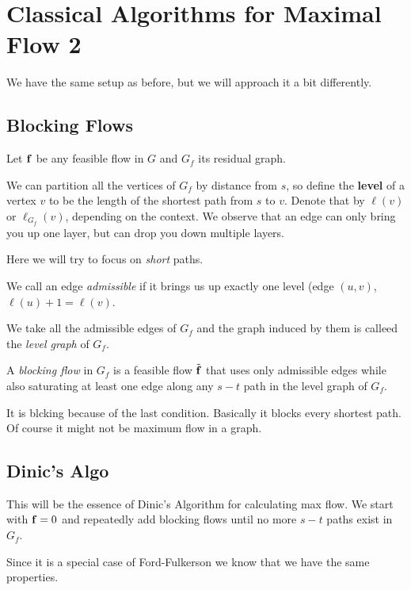 
\section{Classical Algorithms for Maximal Flow 2}
We have the same setup as before, but we will approach it a bit differently.

\subsection{Blocking Flows}

Let $\mathbf{f}$ be any feasible flow in $G$ and $G_f$ its residual graph. 

We can partition all the vertices of $G_f$ by distance from $s$, so define the \textbf{level} of a vertex $v$ to be the length of the shortest path from $s$ to $v$. Denote that by $\ell (v)$ or $\ell_{G_f} (v)$, depending on the context. We observe that an edge can only bring you up one layer, but can drop you down multiple layers.

Here we will try to focus on \textit{short} paths. 

\begin{definicija}
    We call an edge \emph{admissible} if it brings us up exactly one level (edge $(u,v)$, $\ell(u) + 1 = \ell(v)$.

    We take all the admissible edges of $G_f$ and the graph induced by them is calleed the \emph{level graph} of $G_f$.

    A \emph{blocking flow} in $G_f$ is a feasible flow $\Tilde{\mathbf{f}}$ that uses only admissible edges while also saturating at least one edge along any $s-t$ path in the level graph of $G_f$.
    
\end{definicija}

It is blcking because of the last condition. Basically it blocks every shortest path. Of course it might not be maximum flow in a graph.


\subsection{Dinic's Algo}

This will be the essence of Dinic's Algorithm for calculating max flow. We start with $\mathbf{f} = 0$ and repeatedly add blocking flows until no more $s-t$ paths exist in $G_f$.

Since it is a special case of Ford-Fulkerson we know that we have the same properties.


